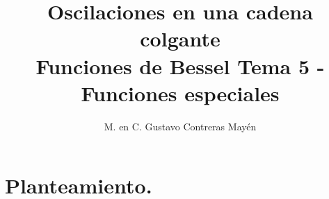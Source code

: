 
\title{Oscilaciones en una cadena colgante \\ \large {Funciones de Bessel Tema 5 - Funciones especiales} \vspace{-3ex}}
\author{M. en C. Gustavo Contreras Mayén}
\date{ }

\pagestyle{fancy}
\fancyhf{}
\lhead{\leftmark}
\rfoot{\thepage}
\setlength{\headheight}{16pt}%

\def\changemargin#1#2{\list{}{\rightmargin#2\leftmargin#1}\item[]}
\let\endchangemargin=\endlist 



\maketitle
\fontsize{14}{14}\selectfont
\tableofcontents
\newpage

\section{Planteamiento.}

